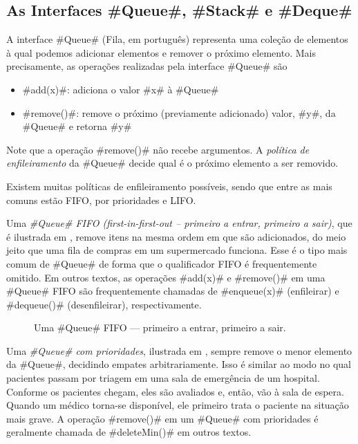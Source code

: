 \subsection{As Interfaces #Queue#, #Stack# e #Deque#}

A interface #Queue# (Fila, em português) representa uma coleção de elementos à qual podemos
%
%
adicionar elementos e remover o próximo elemento. Mais precisamente, as operações
realizadas pela interface #Queue# são
\begin{itemize}
  \item #add(x)#: adiciona o valor #x# à #Queue#
  \item #remove()#: remove o próximo (previamente adicionado) valor, #y#, da #Queue# e retorna #y#
\end{itemize}
Note que a operação #remove()# não recebe argumentos.
A \emph{política de enfileiramento} da #Queue# decide qual é o próximo elemento a ser removido.

Existem muitas políticas de enfileiramento possíveis, sendo que entre as mais comuns estão FIFO, por prioridades e LIFO.

Uma \emph{#Queue# FIFO (first-in-first-out -- primeiro a entrar, primeiro a sair)},
%
%
que é ilustrada em 
, remove itens na mesma ordem em que são adicionados, do meio jeito que uma fila de compras em um supermercado funciona.
Esse é o tipo mais comum de #Queue# de forma que o qualificador FIFO é frequentemente omitido.
Em outros textos, as operações #add(x)# e #remove()# em uma #Queue# FIFO são frequentemente chamadas de  #enqueue(x)# (enfileirar) e #dequeue()# (desenfileirar), respectivamente.

\begin{figure}
  \caption[Uma queue (fila) FIFO]{Uma #Queue# FIFO --- primeiro a entrar, primeiro a sair.}
\end{figure}

Uma \emph{#Queue# com prioridades},
%
%
%
%
ilustrada em , sempre 
remove o menor elemento da #Queue#, decidindo empates arbitrariamente.
Isso é similar ao modo no qual pacientes passam por triagem em uma sala de emergência de um hospital. Conforme os pacientes chegam, eles são avaliados e, então, vão à sala de espera. Quando um médico torna-se disponível, ele primeiro trata o paciente na situação mais grave. A operação #remove()# em um #Queue# com prioridades é geralmente chamada de #deleteMin()# em outros textos.

